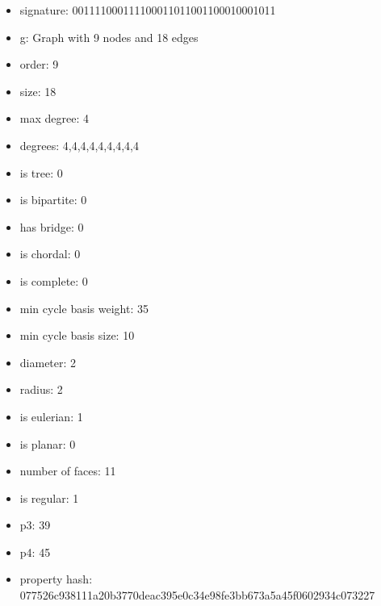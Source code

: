 \newpage
\begin{figure}
\end{figure}
\begin{itemize}
\item signature: 001111000111100011011001100010001011
\item g: Graph with 9 nodes and 18 edges
\item order: 9
\item size: 18
\item max degree: 4
\item degrees: 4,4,4,4,4,4,4,4,4
\item is tree: 0
\item is bipartite: 0
\item has bridge: 0
\item is chordal: 0
\item is complete: 0
\item min cycle basis weight: 35
\item min cycle basis size: 10
\item diameter: 2
\item radius: 2
\item is eulerian: 1
\item is planar: 0
\item number of faces: 11
\item is regular: 1
\item p3: 39
\item p4: 45
\item property hash: 077526c938111a20b3770deac395e0c34e98fe3bb673a5a45f0602934c073227
\end{itemize}
